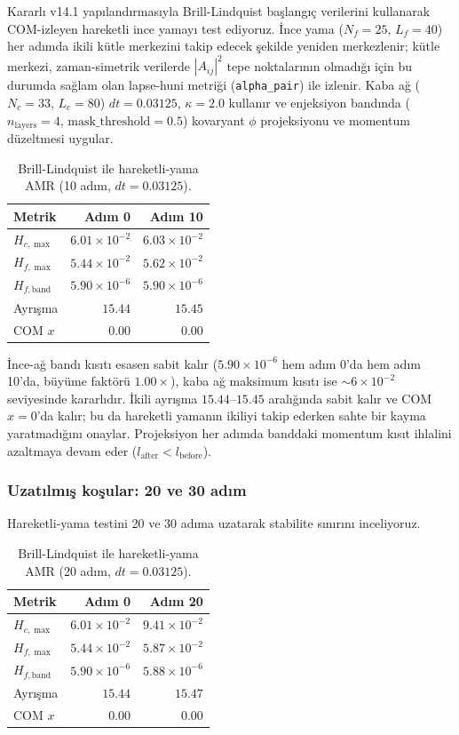 Kararlı v14.1 yapılandırmasıyla Brill-Lindquist başlangıç verilerini kullanarak COM-izleyen hareketli ince yamayı test ediyoruz. İnce yama ($N_f=25$, $L_f=40$) her adımda ikili kütle merkezini takip edecek şekilde yeniden merkezlenir; kütle merkezi, zaman-simetrik verilerde $|A_{ij}|^2$ tepe noktalarının olmadığı için bu durumda sağlam olan lapse-huni metriği (\texttt{alpha\_pair}) ile izlenir. Kaba ağ ($N_c=33$, $L_c=80$) $dt=0.03125$, $\kappa=2.0$ kullanır ve enjeksiyon bandında ($n_{\text{layers}}=4$, $\text{mask\_threshold}=0.5$) kovaryant $\phi$ projeksiyonu ve momentum düzeltmesi uygular.

\begin{table}[t]
\centering
\caption{Brill-Lindquist ile hareketli-yama AMR (10 adım, $dt=0.03125$).}
\label{tab:amr-moving-10}
\begin{tabular}{lrr}
\hline
Metrik & Adım 0 & Adım 10 \\
\hline
$H_{c,\max}$ & $6.01\times 10^{-2}$ & $6.03\times 10^{-2}$ \\
$H_{f,\max}$ & $5.44\times 10^{-2}$ & $5.62\times 10^{-2}$ \\
$H_{f,\text{band}}$ & $5.90\times 10^{-6}$ & $5.90\times 10^{-6}$ \\
Ayrışma & $15.44$ & $15.45$ \\
COM $x$ & $0.00$ & $0.00$ \\
\hline
\end{tabular}
\end{table}

İnce-ağ bandı kısıtı esasen sabit kalır ($5.90\times 10^{-6}$ hem adım 0'da hem adım 10'da, büyüme faktörü $1.00\times$), kaba ağ maksimum kısıtı ise $\sim 6\times 10^{-2}$ seviyesinde kararlıdır. İkili ayrışma $15.44$--$15.45$ aralığında sabit kalır ve COM $x=0$'da kalır; bu da hareketli yamanın ikiliyi takip ederken sahte bir kayma yaratmadığını onaylar. Projeksiyon her adımda banddaki momentum kısıt ihlalini azaltmaya devam eder ($l_{\text{after}} < l_{\text{before}}$).

\subsubsection{Uzatılmış koşular: 20 ve 30 adım}

Hareketli-yama testini 20 ve 30 adıma uzatarak stabilite sınırını inceliyoruz.

\begin{table}[t]
\centering
\caption{Brill-Lindquist ile hareketli-yama AMR (20 adım, $dt=0.03125$).}
\label{tab:amr-moving-20}
\begin{tabular}{lrr}
\hline
Metrik & Adım 0 & Adım 20 \\
\hline
$H_{c,\max}$ & $6.01\times 10^{-2}$ & $9.41\times 10^{-2}$ \\
$H_{f,\max}$ & $5.44\times 10^{-2}$ & $5.87\times 10^{-2}$ \\
$H_{f,\text{band}}$ & $5.90\times 10^{-6}$ & $5.88\times 10^{-6}$ \\
Ayrışma & $15.44$ & $15.47$ \\
COM $x$ & $0.00$ & $0.00$ \\
\hline
\end{tabular}
\end{table}

